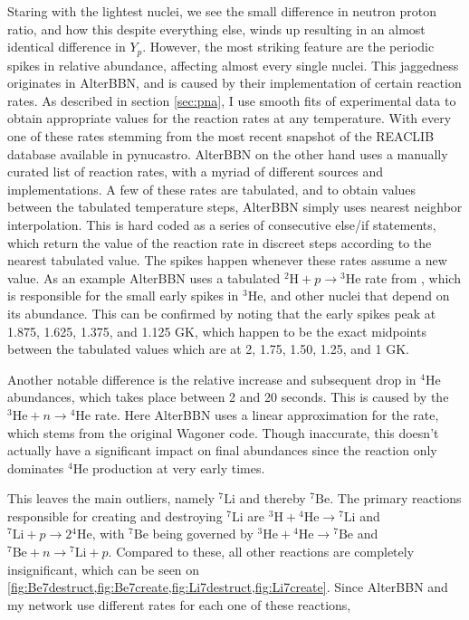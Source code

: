 Staring with the lightest nuclei, we see the small difference in neutron proton ratio, and how this despite everything else, winds up resulting in an almost identical difference in $Y_p$. However, the most striking feature are the periodic spikes in relative abundance, affecting almost every single nuclei. This jaggedness originates in AlterBBN, and is caused by their implementation of certain reaction rates. As described in section \ref{sec:pna}, I use smooth fits of experimental data to obtain appropriate values for the reaction rates at any temperature. With every one of these rates stemming from the most recent snapshot of the REACLIB database\cite{REACLIB} available in pynucastro\cite{pynucastro2}. AlterBBN on the other hand uses a manually curated list of reaction rates, with a myriad of different sources and implementations. A few of these rates are tabulated, and to obtain values between the tabulated temperature steps, AlterBBN simply uses nearest neighbor interpolation. This is hard coded as a series of consecutive else/if statements, which return the value of the reaction rate in discreet steps according to the nearest tabulated value. The spikes happen whenever these rates assume a new value. As an example AlterBBN uses a tabulated ${}^2\text{H}+p\rightarrow {}^3\text{He}$ rate from \textcite{Coc_et_al_2015}, which is responsible for the small early spikes in ${}^3\text{He}$, and other nuclei that depend on its abundance. This can be confirmed by noting that the early spikes peak at 1.875, 1.625, 1.375, and 1.125 GK, which happen to be the exact midpoints between the tabulated values which are at 2, 1.75, 1.50, 1.25, and 1 GK. 

Another notable difference is the relative increase and subsequent drop in ${}^4\text{He}$ abundances, which takes place between 2 and 20 seconds. This is caused by the ${}^3\text{He}+n\rightarrow {}^4\text{He}$ rate. Here AlterBBN uses a linear approximation for the rate, which stems from the original Wagoner code\cite{Wagoner69}. Though inaccurate, this doesn't actually have a significant impact on final abundances since the reaction only dominates ${}^4\text{He}$ production at very early times. 





This leaves the main outliers, namely ${}^7\text{Li}$ and thereby ${}^7\text{Be}$. The primary reactions responsible for creating and destroying ${}^7\text{Li}$ are ${}^3\text{H}+{}^4\text{He}\rightarrow {}^7\text{Li}$ and ${}^7\text{Li} + p\rightarrow 2{}^4\text{He}$, with ${}^7\text{Be}$ being governed by ${}^3\text{He}+{}^4\text{He}\rightarrow {}^7\text{Be}$ and ${}^7\text{Be} + n\rightarrow {}^7\text{Li} + p$. Compared to these, all other reactions are completely insignificant, which can be seen on \cref{fig:Be7destruct,fig:Be7create,fig:Li7destruct,fig:Li7create}. Since AlterBBN and my network use different rates for each one of these reactions, 


